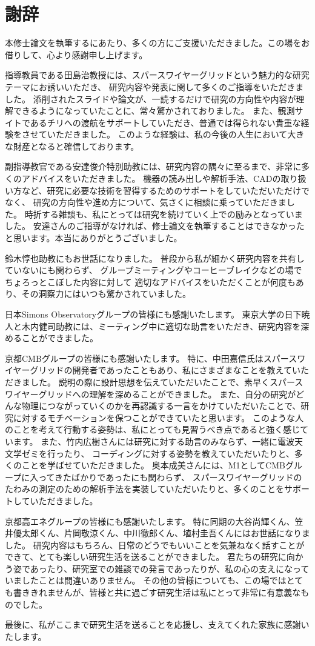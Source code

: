 \documentclass[../../main.tex]{subfiles}
\begin{document}
\chapter*{謝辞}
本修士論文を執筆するにあたり、多くの方にご支援いただきました。この場をお借りして、心より感謝申し上げます。


指導教員である田島治教授には、スパースワイヤーグリッドという魅力的な研究テーマにお誘いいただき、
研究内容や発表に関して多くのご指導をいただきました。
添削されたスライドや論文が、一読するだけで研究の方向性や内容が理解できるようになっていたことに、常々驚かされておりました。
また、観測サイトであるチリへの渡航をサポートしていただき、普通では得られない貴重な経験をさせていただきました。
このような経験は、私の今後の人生において大きな財産となると確信しております。

副指導教官である安達俊介特別助教には、研究内容の隅々に至るまで、非常に多くのアドバイスをいただきました。
機器の読み出しや解析手法、CADの取り扱い方など、研究に必要な技術を習得するためのサポートをしていただいただけでなく、
研究の方向性や進め方について、気さくに相談に乗っていただきました。
時折する雑談も、私にとっては研究を続けていく上での励みとなっていました。
安達さんのご指導がなければ、修士論文を執筆することはできなかったと思います。本当にありがとうございました。

鈴木惇也助教にもお世話になりました。
普段から私が細かく研究内容を共有していないにも関わらず、
グループミーティングやコーヒーブレイクなどの場でちょろっとこぼした内容に対して
適切なアドバイスをいただくことが何度もあり、その洞察力にはいつも驚かされていました。

日本Simons Observatoryグループの皆様にも感謝いたします。
東京大学の日下暁人と木内健司助教には、ミーティング中に適切な助言をいただき、研究内容を深めることができました。

京都CMBグループの皆様にも感謝いたします。
特に、中田嘉信氏はスパースワイヤーグリッドの開発者であったこともあり、私にさまざまなことを教えていただきました。
説明の際に設計思想を伝えていただいたことで、素早くスパースワイヤーグリッドへの理解を深めることができました。
また、自分の研究がどんな物理につながっていくのかを再認識する一言をかけていただいたことで、研究に対するモチベーションを保つことができていたと思います。
このような人のことを考えて行動する姿勢は、私にとっても見習うべき点であると強く感じています。
また、竹内広樹さんには研究に対する助言のみならず、一緒に電波天文学ゼミを行ったり、
コーディングに対する姿勢を教えていただいたりと、多くのことを学ばせていただきました。
奥本成美さんには、M1としてCMBグループに入ってきたばかりであったにも関わらず、
スパースワイヤーグリッドのたわみの測定のための解析手法を実装していただいたりと、多くのことをサポートしていただきました。

京都高エネグループの皆様にも感謝いたします。
特に同期の大谷尚輝くん、笠井優太郎くん、片岡敬涼くん、中川徹郎くん、埴村圭吾くんにはお世話になりました。
研究内容はもちろん、日常のどうでもいいことを気兼ねなく話すことができて、とても楽しい研究生活を送ることができました。
君たちの研究に向かう姿であったり、研究室での雑談での発言であったりが、私の心の支えになっていましたことは間違いありません。
その他の皆様についても、この場ではとても書ききれませんが、皆様と共に過ごす研究生活は私にとって非常に有意義なものでした。

最後に、私がここまで研究生活を送ることを応援し、支えてくれた家族に感謝いたします。
\end{document}
